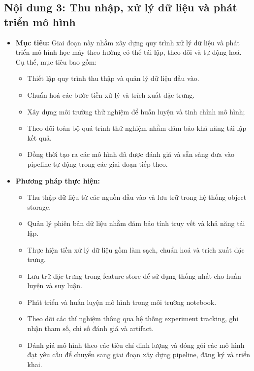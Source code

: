 \subsection{Nội dung 3: Thu nhập, xử lý dữ liệu và phát triển mô hình}

\begin{itemize}
    \item \textbf{Mục tiêu:} 
     Giai đoạn này nhằm xây dựng quy trình xử lý dữ liệu và phát triển mô hình học máy theo hướng có thể tái lập, theo dõi và tự động hoá. Cụ thể, mục tiêu bao gồm: 
        \begin{itemize}
             \item Thiết lập quy trình thu thập và quản lý dữ liệu đầu vào.
             \item Chuẩn hoá các bước tiền xử lý và trích xuất đặc trưng.
             \item Xây dựng môi trường thử nghiệm để huấn luyện và tinh chỉnh mô hình; 
             \item Theo dõi toàn bộ quá trình thử nghiệm nhằm đảm bảo khả năng tái lập kết quả.
             \item Đồng thời tạo ra các mô hình đã được đánh giá và sẵn sàng đưa vào pipeline tự động trong các giai đoạn tiếp theo.
        \end{itemize}
    
    \item \textbf{Phương pháp thực hiện:}
        \begin{itemize}
            \item Thu thập dữ liệu từ các nguồn đầu vào và lưu trữ trong hệ thống object storage.
            \item Quản lý phiên bản dữ liệu nhằm đảm bảo tính truy vết và khả năng tái lập.
            \item Thực hiện tiền xử lý dữ liệu gồm làm sạch, chuẩn hoá và trích xuất đặc trưng.
            \item Lưu trữ đặc trưng trong feature store để sử dụng thống nhất cho huấn luyện và suy luận.
            \item Phát triển và huấn luyện mô hình trong môi trường notebook.
            \item Theo dõi các thí nghiệm thông qua hệ thống experiment tracking, ghi nhận tham số, chỉ số đánh giá và artifact.
            \item Đánh giá mô hình theo các tiêu chí định lượng và đóng gói các mô hình đạt yêu cầu để chuyển sang giai đoạn xây dựng pipeline, đăng ký và triển khai.
        \end{itemize}

\end{itemize}


